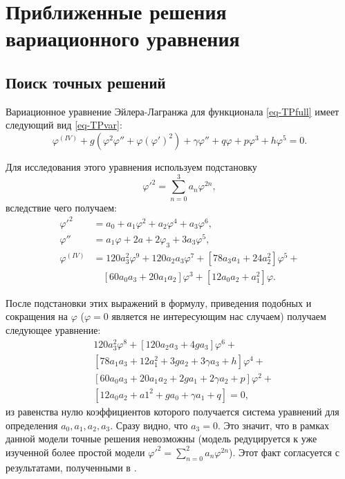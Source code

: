 
\chapter{Приближенные решения вариационного уравнения}\label{ch-solution}

\section{Поиск точных решений}\label{sec-exact}
Вариационное уравнение Эйлера-Лагранжа для функционала \eqref{eq-TPfull} имеет следующий вид \eqref{eq-TPvar}:
\begin{equation*}
\varphi^{(IV)} + 
g\left(\varphi^2\varphi'' + \varphi\left(\varphi'\right)^2\right) +
\gamma\varphi'' + q\varphi + p\varphi^3 + h\varphi^5 = 0.
\label{eq-TPvar_}
\end{equation*}

Для исследования этого уравнения используем подстановку
\begin{equation}
\varphi'^2 = \sum_{n=0}^3 a_n \varphi^{2n},
\label{eq-subst3}
\end{equation}
вследствие чего получаем:
\begin{equation}
\begin{aligned}
\varphi'^2 &= a_0 + a_1\varphi^2 + a_2\varphi^4 + a_3\varphi^6,\\
\varphi'' &= a_1\varphi + 2a+2\varphi_3 + 3a_3\varphi^5, \\
\varphi^{(IV)} &= 120a_3^2\varphi^9 + 120a_2a_3\varphi^7 + 
\left[78a_3a_1 + 24a_2^2\right]\varphi^5 + \\
&\quad\left[60a_0a_3 + 20a_1a_2\right]\varphi^3 +  
\left[12a_0a_2+a_1^2\right]\varphi.
\end{aligned}
\end{equation}

После подстановки этих выражений в формулу, приведения подобных и сокращения на  $\varphi$ ($\varphi = 0$ является не интересующим нас случаем) получаем следующее уравнение:
\begin{equation}\label{}
\begin{aligned}
&120a_3^2\varphi^8 + \left[120a_2a_3 + 4ga_3\right]\varphi^6 + \\
&\left[78a_1a_3 + 12a_1^2 + 3ga_2 + 3\gamma a_3 +h\right]\varphi^4 + \\
&\left[60a_0a_3 + 20a_1a_2 + 2ga_1 + 2\gamma a_2 + p\right]\varphi^2 + \\
&\left[12a_0a_2 + a1^2 + ga_0 + \gamma a_1 + q\right] = 0,
\end{aligned}
\end{equation}
из равенства нулю коэффициентов которого получается система уравнений для определения $a_0, a_1, a_2, a_3$. Сразу видно, что $a_3=0$. Это значит, что в рамках данной модели точные решения невозможны (модель редуцируется к уже изученной более простой модели $\varphi'^2 = \sum_{n=0}^2 a_n \varphi^{2n}$). Этот факт согласуется с результатами, полученными в \cite{Berezovsky1998}.

